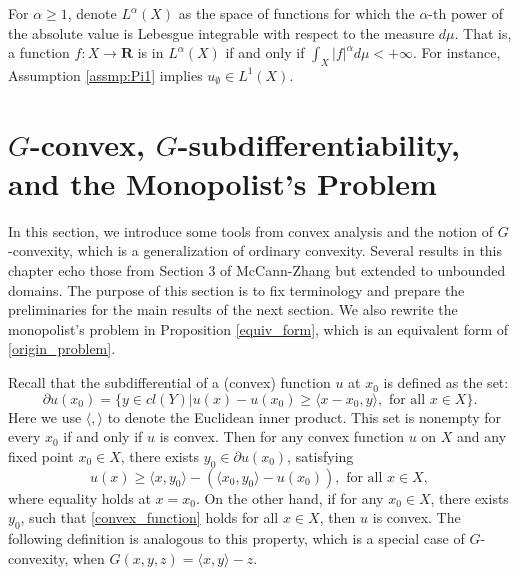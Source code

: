 \documentclass[a4paper, 11pt]{amsart}
\numberwithin{equation}{section}
\theoremstyle{plain}
\theoremstyle{definition}
\theoremstyle{remark}
\newcommand{\R}{\mathbf{R}}
\begin{document}
For $\alpha \ge 1$, denote $L^{\alpha}(X)$ as the space of functions for which the $\alpha$-th power of the absolute value is Lebesgue integrable {with respect to the measure $d \mu$}. That is, a function $f: X\longrightarrow \R$ is in $L^{\alpha}(X)$ if and only if $\int_{X} |f|^{\alpha} d\mu <+\infty$. For instance, Assumption \ref{assmp:Pi1} implies $u_{\emptyset}\in L^{1}(X)$.\medskip



 

 







\bigskip



\section{$G$-convex, $G$-subdifferentiability, and the Monopolist's Problem}\label{section:preliminary}

In this section, we introduce some tools from convex analysis and the notion of $G$-convexity, which is a generalization of ordinary convexity. {Several results in this chapter echo those from Section 3 of McCann-Zhang \cite{McCannZhang17} but extended to unbounded domains.} {
	The purpose of this section is to fix terminology and prepare the preliminaries for the main results of the next section.} We also rewrite the monopolist's problem in Proposition \ref{equiv_form}, which is an equivalent form of \eqref{origin_problem}. \medskip

{Recall that the subdifferential of a (convex) function $u$ at $x_0$ is defined as the set:
\begin{equation*}
	\partial u(x_0) = \{ y \in cl(Y)| u(x) - u(x_0) \ge \langle  x- x_0,  y \rangle, \text{ for all } x \in X  \}.
\end{equation*}
Here we use $ \langle , \rangle$ to denote the Euclidean inner product. This set is nonempty for every $x_0$ if and only if $u$ is convex.} Then for any convex function $u$ on $X$ and any fixed point $x_0 \in X$, there exists $y_0 \in \partial u(x_0)$, satisfying%
\begin{equation}\label{convex_function}
u(x) \ge  \langle x , y_0\rangle -( \langle x_0, y_0\rangle -  u(x_0)),	\text{  for all $x \in X$},
\end{equation} 
where equality holds at $x = x_0$. On the other hand, if for any $x_0\in X$, there exists $y_0$, such that \eqref{convex_function} holds for all $x\in X$, then $u$ is convex. The following definition is analogous to this property, which is a special case of $G$-convexity, when $G(x,y,z) = \langle x, y \rangle -z$.
\end{document}
